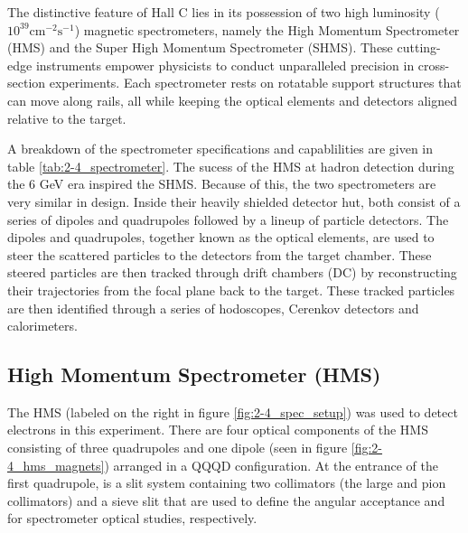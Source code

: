 \documentclass[
]{report}
\begin{document}
\label{Chapter-2-4}

The distinctive feature of Hall C lies in its possession of two high
luminosity (\(10^{39}\text{cm}^{-2}\text{s}^{-1}\)) magnetic
spectrometers, namely the High Momentum Spectrometer (HMS) and the Super
High Momentum Spectrometer (SHMS). These cutting-edge instruments
empower physicists to conduct unparalleled precision in cross-section
experiments. Each spectrometer rests on rotatable support structures
that can move along rails, all while keeping the optical elements and
detectors aligned relative to the target.



A breakdown of the spectrometer specifications and capablilities are
given in table \ref{tab:2-4_spectrometer}. The sucess of the HMS at
hadron detection during the 6 GeV era inspired the SHMS. Because of
this, the two spectrometers are very similar in design. Inside their
heavily shielded detector hut, both consist of a series of dipoles and
quadrupoles followed by a lineup of particle detectors. The dipoles and
quadrupoles, together known as the optical elements, are used to steer
the scattered particles to the detectors from the target chamber. These
steered particles are then tracked through drift chambers (DC) by
reconstructing their trajectories from the focal plane back to the
target. These tracked particles are then identified through a series of
hodoscopes, Cerenkov detectors and calorimeters.



\hypertarget{high-momentum-spectrometer-hms}{%
\subsection{High Momentum Spectrometer
(HMS)}\label{high-momentum-spectrometer-hms}}

The HMS (labeled on the right in figure \ref{fig:2-4_spec_setup}) was
used to detect electrons in this experiment. There are four optical
components of the HMS consisting of three quadrupoles and one dipole
(seen in figure \ref{fig:2-4_hms_magnets}) arranged in a QQQD
configuration. At the entrance of the first quadrupole, is a slit system
containing two collimators (the large and pion collimators) and a sieve
slit that are used to define the angular acceptance and for spectrometer
optical studies, respectively.


\end{document}
